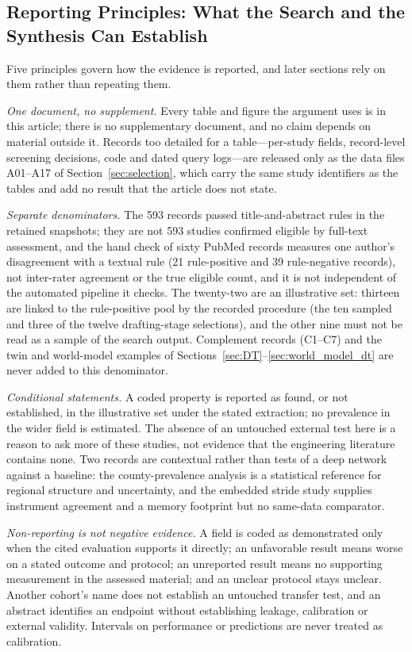 \documentclass[journal]{IEEEtran}
\begin{document}
\subsection{Reporting Principles: What the Search and the Synthesis Can Establish}
\label{sec:scopeaudit}
Five principles govern how the evidence is reported, and later sections rely on them rather than repeating them.

\emph{One document, no supplement.} Every table and figure the argument uses is in this article; there is no supplementary document, and no claim depends on material outside it. Records too detailed for a table---per-study fields, record-level screening decisions, code and dated query logs---are released only as the data files A01--A17 of Section~\ref{sec:selection}, which carry the same study identifiers as the tables and add no result that the article does not state.

\emph{Separate denominators.} The 593 records passed title-and-abstract rules in the retained snapshots; they are not 593 studies confirmed eligible by full-text assessment, and the hand check of sixty PubMed records measures one author's disagreement with a textual rule (21 rule-positive and 39 rule-negative records), not inter-rater agreement or the true eligible count, and it is not independent of the automated pipeline it checks. The twenty-two are an illustrative set: thirteen are linked to the rule-positive pool by the recorded procedure (the ten sampled and three of the twelve drafting-stage selections), and the other nine must not be read as a sample of the search output. Complement records (C1--C7) and the twin and world-model examples of Sections~\ref{sec:DT}--\ref{sec:world_model_dt} are never added to this denominator.

\emph{Conditional statements.} A coded property is reported as found, or not established, in the illustrative set under the stated extraction; no prevalence in the wider field is estimated. The absence of an untouched external test here is a reason to ask more of these studies, not evidence that the engineering literature contains none. Two records are contextual rather than tests of a deep network against a baseline: the county-prevalence analysis is a statistical reference for regional structure and uncertainty, and the embedded stride study supplies instrument agreement and a memory footprint but no same-data comparator.

\emph{Non-reporting is not negative evidence.} A field is coded as demonstrated only when the cited evaluation supports it directly; an unfavorable result means worse on a stated outcome and protocol; an unreported result means no supporting measurement in the assessed material; and an unclear protocol stays unclear. Another cohort's name does not establish an untouched transfer test, and an abstract identifies an endpoint without establishing leakage, calibration or external validity. Intervals on performance or predictions are never treated as calibration.
\end{document}
